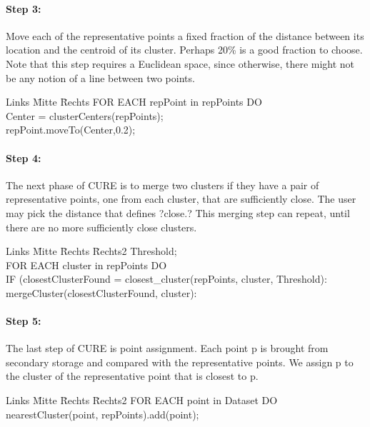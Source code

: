 \documentclass[11pt,a4paper]{scrartcl}
\begin{document}
\paragraph{Step 3:}
Move each of the representative points a fixed fraction of the distance between its location and the centroid of its cluster. Perhaps 20\% is a good fraction to choose. Note that this step requires a Euclidean space, since otherwise, there might not be any notion of a line between two points.

\begin{tabbing}
Links \= Mitte \= Rechts \kill
\> FOR EACH repPoint in repPoints DO\\
\> \> 	Center = clusterCenters(repPoints);\\
\> \> 	repPoint.moveTo(Center,0.2);
\end{tabbing}

\paragraph{Step 4:}
The next phase of CURE is to merge two clusters if they have a pair of representative points, one from each cluster, that are sufficiently close. The user may pick the distance that defines ?close.? This merging step can repeat, until there are no more sufficiently close clusters.
\begin{tabbing}
Links \= Mitte \= Rechts  \=Rechts2 \kill
\> 	Threshold;\\
\> 	FOR EACH cluster in repPoints DO\\
\> \> 		IF (closestClusterFound = closest\_cluster(repPoints, cluster, Threshold):\\
\> \> 	\>		mergeCluster(closestClusterFound, cluster):
\end{tabbing}
\paragraph{Step 5:}
The last step of CURE is point assignment. Each point p is brought from secondary storage and compared with the representative points. We assign p to the cluster of the representative point that is closest to p.
\begin{tabbing}
Links \= Mitte \= Rechts  \=Rechts2 \kill
\> FOR EACH point in Dataset DO\\
\> \>	nearestCluster(point, repPoints).add(point);
\end{tabbing}
\end{document}
